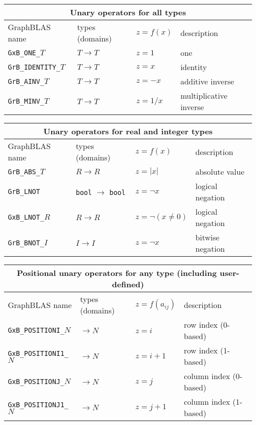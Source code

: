 \documentclass[12pt]{article}
\begin{document}
\vspace{0.2in}
{\footnotesize
\begin{tabular}{|llll|}
\hline
\multicolumn{4}{|c|}{Unary operators for all types} \\
\hline
GraphBLAS name          & types (domains)   & $z=f(x)$      & description \\
\hline
\verb'GxB_ONE_'$T$      & $T \rightarrow T$ & $z = 1$       & one \\
\verb'GrB_IDENTITY_'$T$ & $T \rightarrow T$ & $z = x$       & identity \\
\verb'GrB_AINV_'$T$     & $T \rightarrow T$ & $z = -x$      & additive inverse \\
\verb'GrB_MINV_'$T$     & $T \rightarrow T$ & $z = 1/x$     & multiplicative inverse \\
\hline
\end{tabular}

\vspace{0.2in}
\begin{tabular}{|llll|}
\hline
\multicolumn{4}{|c|}{Unary operators for real and integer types} \\
\hline
GraphBLAS name          & types (domains)   & $z=f(x)$      & description \\
\hline
\verb'GrB_ABS_'$T$      & $R \rightarrow R$ & $z = |x|$     & absolute value \\
\verb'GrB_LNOT'         & \verb'bool'
                          $\rightarrow$
                          \verb'bool'       & $z = \lnot x$ & logical negation \\
\verb'GxB_LNOT_'$R$     & $R \rightarrow R$ & $z = \lnot (x \ne 0)$ & logical negation \\
\verb'GrB_BNOT_'$I$     & $I \rightarrow I$ & $z = \lnot x$ & bitwise negation \\
\hline
\end{tabular}

\vspace{0.2in}
\begin{tabular}{|llll|}
\hline
\multicolumn{4}{|c|}{Positional unary operators for any type (including user-defined)} \\
\hline
GraphBLAS name            & types (domains)   & $z=f(a_{ij})$      & description \\
\hline
\verb'GxB_POSITIONI_'$N$  & $ \rightarrow N$  & $z = i$       & row index (0-based) \\
\verb'GxB_POSITIONI1_'$N$ & $ \rightarrow N$  & $z = i+1$     & row index (1-based) \\
\verb'GxB_POSITIONJ_'$N$  & $ \rightarrow N$  & $z = j$       & column index (0-based) \\
\verb'GxB_POSITIONJ1_'$N$ & $ \rightarrow N$  & $z = j+1$     & column index (1-based) \\
\hline
\end{tabular}
\vspace{0.2in}

}
\end{document}
